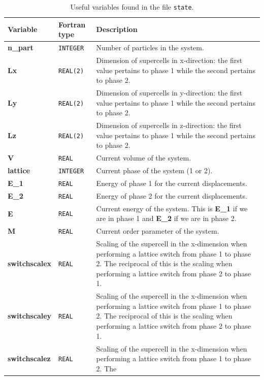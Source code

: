 \documentclass{report}
\begin{document}
\begin{landscape}
\begin{center}\label{table:state_variables}
\begin{longtable}{ l l p{8cm}}
\caption{Useful variables found in the file \texttt{state}.}
\\

Variable & Fortran type & Description \\
\hline
\textbf{n\_part} & \texttt{INTEGER} & Number of particles in the system. \\
\textbf{Lx} & \texttt{REAL(2)} & Dimension of supercells in x-direction: the first value pertains to phase 1 while the second pertains to phase 2.\\
\textbf{Ly} & \texttt{REAL(2)} & Dimension of supercells in y-direction: the first value pertains to phase 1 while the second pertains to phase 2.\\
\textbf{Lz} & \texttt{REAL(2)} & Dimension of supercells in z-direction: the first value pertains to phase 1 while the second pertains to phase 2.\\
\textbf{V} & \texttt{REAL} & Current volume of the system.\\
\textbf{lattice} & \texttt{INTEGER} & Current phase of the system (1 or 2).\\
\textbf{E\_1} & \texttt{REAL} & Energy of phase 1 for the current displacements. \\
\textbf{E\_2} & \texttt{REAL} & Energy of phase 2 for the current displacements. \\
\textbf{E} & \texttt{REAL} & Current energy of the system. This is \textbf{E\_1} if we are in phase 1 and \textbf{E\_2} if we are in phase 2.\\
\textbf{M} & \texttt{REAL} & Current order parameter of the system.\\
\textbf{switchscalex} & \texttt{REAL} & Scaling of the supercell in the x-dimension when performing a lattice switch from phase 1 to phase 2. The 
reciprocal of this is the scaling when performing a lattice switch from phase 2 to phase 1.\\
\textbf{switchscaley} & \texttt{REAL} & Scaling of the supercell in the x-dimension when performing a lattice switch from phase 1 to phase 2. The 
reciprocal of this is the scaling when performing a lattice switch from phase 2 to phase 1. \\
\textbf{switchscalez} & \texttt{REAL} & Scaling of the supercell in the x-dimension when performing a lattice switch from phase 1 to phase 2. The 

\end{longtable}
\end{center}
\end{landscape}
\end{document}
